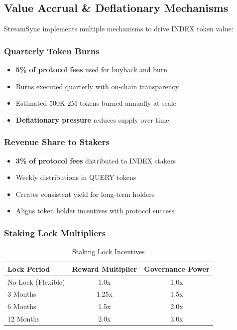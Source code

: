 \documentclass[12pt,a4paper]{article}
\begin{document}
\subsection{Value Accrual \& Deflationary Mechanisms}

StreamSync implements multiple mechanisms to drive INDEX token value:

\subsubsection{Quarterly Token Burns}
\begin{itemize}
    \item \textbf{5\% of protocol fees} used for buyback and burn
    \item Burns executed quarterly with on-chain transparency
    \item Estimated 500K-2M tokens burned annually at scale
    \item \textbf{Deflationary pressure} reduces supply over time
\end{itemize}

\subsubsection{Revenue Share to Stakers}
\begin{itemize}
    \item \textbf{3\% of protocol fees} distributed to INDEX stakers
    \item Weekly distributions in QUERY tokens
    \item Creates consistent yield for long-term holders
    \item Aligns token holder incentives with protocol success
\end{itemize}

\subsubsection{Staking Lock Multipliers}
\begin{table}[h]
\centering
\begin{tabular}{lcc}
\toprule
\textbf{Lock Period} & \textbf{Reward Multiplier} & \textbf{Governance Power} \\
\midrule
No Lock (Flexible) & 1.0x & 1.0x \\
3 Months & 1.25x & 1.5x \\
6 Months & 1.5x & 2.0x \\
12 Months & 2.0x & 3.0x \\
\bottomrule
\end{tabular}
\caption{Staking Lock Incentives}
\end{table}
\end{document}
